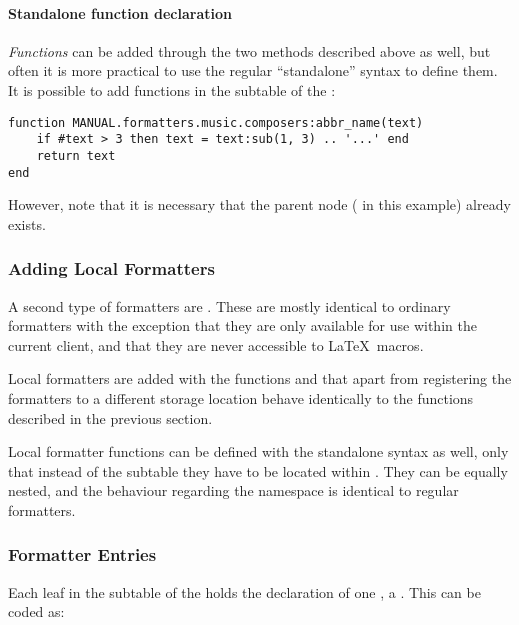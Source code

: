 \documentclass[12pt]{scrartcl}
\begin{document}
\paragraph{Standalone function declaration}

\emph{Functions} can be added through the two methods described above as well, but often it is more practical to use the regular “standalone” syntax to define them.  It is possible to add functions in the  subtable of the :

\begin{verbatim}
function MANUAL.formatters.music.composers:abbr_name(text)
	if #text > 3 then text = text:sub(1, 3) .. '...' end
    return text
end
\end{verbatim}

\noindent However, note that it is necessary that the parent node
( in this example) already exists.


\subsubsection{Adding Local Formatters}
\label{sec:usage:adding-local-formatters}

A second type of formatters are .  These
are mostly identical to ordinary formatters with the exception that they are
only available for use within the current client, and that they are never
accessible to \LaTeX\ macros.

Local formatters are added with the functions
 and 
that apart from registering the formatters to a different storage location
behave identically to the functions described in the previous section.

Local formatter functions can be defined with the standalone syntax as well,
only that instead of the  subtable they have to be located
within .  They can be equally nested, and the behaviour regarding
the namespace is identical to regular formatters.


\subsubsection{Formatter Entries}
\label{sec:usage:formatter-entries}

Each leaf in the  subtable of the 
holds the declaration of one , a .  This
can be coded as:
\end{document}

